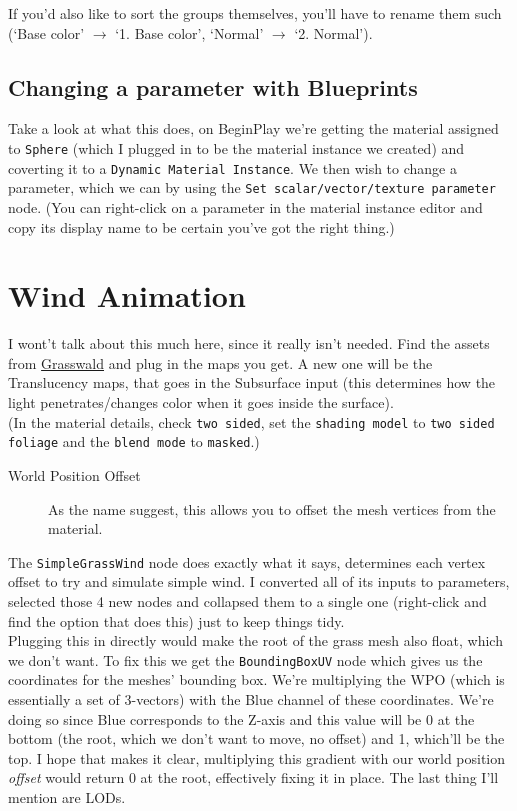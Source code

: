\documentclass{article}
\begin{document}
If you'd also like to sort the groups themselves, you'll have to rename them such (`Base color' $\rightarrow$ `1. Base color', `Normal' $\rightarrow$ `2. Normal').

\subsection{Changing a parameter with Blueprints}
Take a look at what this does, on BeginPlay we're getting the material assigned to \verb|Sphere| (which I plugged in to be the material instance we created) and coverting it to a \verb|Dynamic Material Instance|. We then wish to change a parameter, which we can by using the \verb|Set scalar/vector/texture parameter| node. (You can right-click on a parameter in the material instance editor and copy its display name to be certain you've got the right thing.)

\section{Wind Animation}
I wont't talk about this much here, since it really isn't needed. Find the assets from \href{https://store.gscatter.com/assets}{Grasswald} and plug in the maps you get. A new one will be the Translucency maps, that goes in the Subsurface input (this determines how the light penetrates/changes color when it goes inside the surface).
\\[10pt]
(In the material details, check \verb|two sided|, set the \verb|shading model| to \verb|two sided foliage| and the \verb|blend mode| to \verb|masked|.)
\begin{description}
    \item[World Position Offset] As the name suggest, this allows you to offset the mesh vertices from the material.
\end{description} 
The \verb|SimpleGrassWind| node does exactly what it says, determines each vertex offset to try and simulate simple wind. I converted all of its inputs to parameters, selected those 4 new nodes and collapsed them to a single one (right-click and find the option that does this) just to keep things tidy. 
\\[10pt]
Plugging this in directly would make the root of the grass mesh also float, which we don't want. To fix this we get the \verb|BoundingBoxUV| node which gives us the coordinates for the meshes' bounding box. We're multiplying the WPO (which is essentially a set of 3-vectors) with the Blue channel of these coordinates. We're doing so since Blue corresponds to the Z-axis and this value will be 0 at the bottom (the root, which we don't want to move, no offset) and 1, which'll be the top.
\newpage
I hope that makes it clear, multiplying this gradient with our world position \emph{offset} would return 0 at the root, effectively fixing it in place. The last thing I'll mention are LODs.
\end{document}
